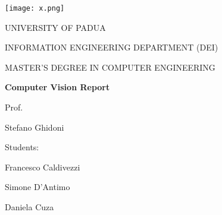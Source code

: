 \begin{titlepage}
    \begin{center}
        \texttt{[image: x.png]}
        
        \vspace*{1cm}
        \Large
        \textmd{UNIVERSITY OF PADUA}
        
        \vspace*{1cm}
        \large
        \textmd{INFORMATION ENGINEERING DEPARTMENT (DEI)}
                
        \vspace*{0.5cm}
        \large
        \textmd{MASTER'S DEGREE IN COMPUTER ENGINEERING} 
                
        \vspace*{1cm}
        \Huge
        \textbf{Computer Vision Report}
        
        
        \raggedright
        \vspace*{1cm}
        \large
        \textmd{Prof.}
        
        \textmd{Stefano Ghidoni}
        
        \raggedleft
        \vspace*{0.5cm}
        \large
        \textmd{Students:}
        
        \textmd{Francesco Caldivezzi}
        
        \textmd{Simone D'Antimo}
        
        \textmd{Daniela Cuza}
        
    \end{center}
\end{titlepage}
